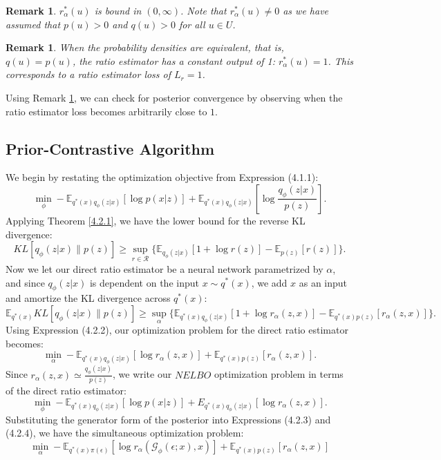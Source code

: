 \documentclass[honours,12pt]{unswthesis}
\newcommand{\E}{\mathbb{E}}
\newtheorem{remark}[theorem]{Remark}
\numberwithin{equation}{section}
\theoremstyle{definition}
\begin{document}
\begin{remark}
$r_\alpha^*(u)$ is bound in $(0,\infty)$. Note that $r_\alpha^*(u)\neq 0$ as we have assumed that $p(u)>0$ and $q(u)>0$ for all $u\in U$.
\end{remark}
\begin{remark}\label{rem:4.2.4}
When the probability densities are equivalent, that is, $q(u)=p(u)$, the ratio estimator has a constant output of 1: $r^*_\alpha(u)=1$. This corresponds to a ratio estimator loss of $L_r=1$.
\end{remark}
Using Remark \ref{rem:4.2.4}, we can check for posterior convergence by observing when the ratio estimator loss becomes arbitrarily close to $1$.
\subsection{Prior-Contrastive Algorithm}\label{sec:4.2.2}
We begin by restating the optimization objective from Expression (4.1.1):
\[\min_\phi -\mathbb{E}_{q^*(x)q_\phi(z|x)}[\log p(x|z)]+\mathbb{E}_{q^*(x)q_\phi(z|x)}\left[\log \frac{q_\phi(z|x)}{p(z)}\right].\]
Applying Theorem \ref{4.2.1}, we have the lower bound for the reverse KL divergence:
\[KL[q_\phi(z|x)\|p(z)]\geq \sup_{\hat{r}\in \mathcal{R}}\{\mathbb{E}_{q_\phi(z|x)}[1+\log r(z)]-\mathbb{E}_{p(z)}[r(z)]\}.\]
Now we let our direct ratio estimator be a neural network parametrized by $\alpha$, and since $q_\phi(z|x)$ is dependent on the input $x\sim q^*(x)$, we add $x$ as an input and amortize the KL divergence across $q^*(x)$:
\[\mathbb{E}_{q^*(x)}KL[q_\phi(z|x)\|p(z)]\geq \sup_\alpha \{\mathbb{E}_{q^*(x)q_\phi(z|x)}[1+\log r_\alpha(z,x)]-\mathbb{E}_{q^*(x)p(z)}[r_\alpha (z,x)]\}.\]
Using Expression (4.2.2), our optimization problem for the direct ratio estimator becomes:
\begin{equation}
\min_\alpha -\E_{q^*(x)q_\phi(z|x)}[\log r_\alpha(z,x)]+\E_{q^*(x)p(z)}[r_\alpha (z,x)].
\end{equation}
Since $r_\alpha(z,x)\simeq \frac{q_\phi(z|x)}{p(z)}$, we write our $NELBO$ optimization problem in terms of the direct ratio estimator:
\begin{equation}
\min_\phi -\mathbb{E}_{q^*(x)q_\phi(z|x)}\left[\log p(x|z)\right]+E_{q^*(x)q_\phi (z|x)}[\log r_\alpha(z,x)].
\end{equation}
Substituting the generator form of the posterior into Expressions (4.2.3) and (4.2.4), we have the simultaneous optimization problem:
\[\min_\alpha -\mathbb{E}_{q^*(x)\pi(\epsilon)}[\log r_\alpha(\mathcal{G}_\phi(\epsilon;x),x)]+\mathbb{E}_{q^*(x)p(z)}[r_\alpha(z,x)]\]
\end{document}
